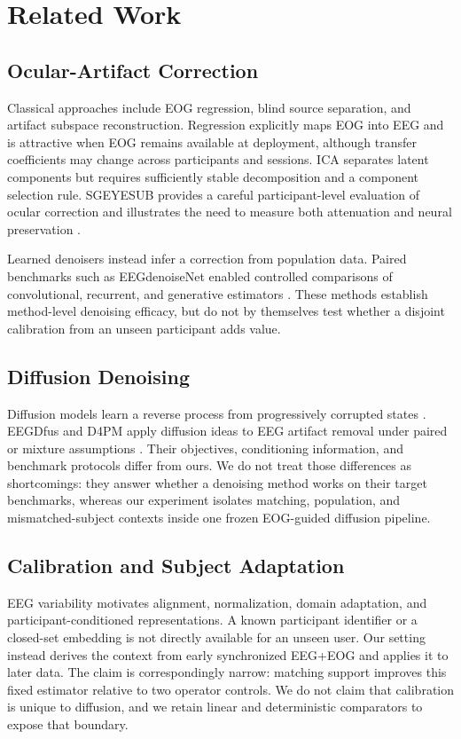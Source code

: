 \section{Related Work}
\label{sec:related}

\subsection{Ocular-Artifact Correction}
Classical approaches include EOG regression, blind source separation, and
artifact subspace reconstruction. Regression explicitly maps EOG into EEG and
is attractive when EOG remains available at deployment, although transfer
coefficients may change across participants and sessions. ICA separates latent
components but requires sufficiently stable decomposition and a component
selection rule. SGEYESUB provides a careful participant-level evaluation of
ocular correction and illustrates the need to measure both attenuation and
neural preservation \cite{kobler2020sgeyesub}.

Learned denoisers instead infer a correction from population data. Paired
benchmarks such as EEGdenoiseNet enabled controlled comparisons of convolutional,
recurrent, and generative estimators \cite{zhang2021eegdenoisenet}. These
methods establish method-level denoising efficacy, but do not by themselves
test whether a disjoint calibration from an unseen participant adds value.

\subsection{Diffusion Denoising}
Diffusion models learn a reverse process from progressively corrupted states
\cite{ho2020ddpm}. EEGDfus and D4PM apply diffusion ideas to EEG artifact
removal under paired or mixture assumptions \cite{eegdfus2024,d4pm2025}.
Their objectives, conditioning information, and benchmark protocols differ
from ours. We do not treat those differences as shortcomings: they answer
whether a denoising method works on their target benchmarks, whereas our
experiment isolates matching, population, and mismatched-subject contexts
inside one frozen EOG-guided diffusion pipeline.

\subsection{Calibration and Subject Adaptation}
EEG variability motivates alignment, normalization, domain adaptation, and
participant-conditioned representations. A known participant identifier or a
closed-set embedding is not directly available for an unseen user. Our setting
instead derives the context from early synchronized EEG+EOG and applies it to
later data. The claim is correspondingly narrow: matching support improves this
fixed estimator relative to two operator controls. We do not claim that
calibration is unique to diffusion, and we retain linear and deterministic
comparators to expose that boundary.
